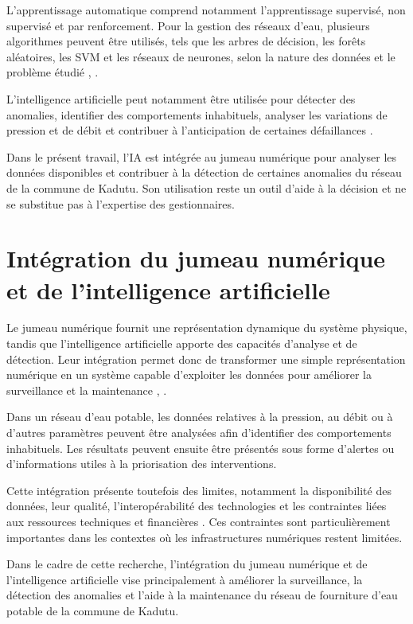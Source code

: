 L'apprentissage automatique comprend notamment l'apprentissage supervisé,
non supervisé et par renforcement. Pour la gestion des réseaux d'eau,
plusieurs algorithmes peuvent être utilisés, tels que les arbres de
décision, les forêts aléatoires, les SVM et les réseaux de neurones,
selon la nature des données et le problème étudié \cite{ref70},
\cite{ref71}.

L'intelligence artificielle peut notamment être utilisée pour détecter
des anomalies, identifier des comportements inhabituels, analyser les
variations de pression et de débit et contribuer à l'anticipation de
certaines défaillances \cite{ref73}.

Dans le présent travail, l'IA est intégrée au jumeau numérique pour
analyser les données disponibles et contribuer à la détection de
certaines anomalies du réseau de la commune de Kadutu. Son utilisation
reste un outil d'aide à la décision et ne se substitue pas à
l'expertise des gestionnaires.

\section{Intégration du jumeau numérique et de l'intelligence artificielle}
\label{integration-du-jumeau-numerique-et-de-lintelligence-artificielle}

Le jumeau numérique fournit une représentation dynamique du système
physique, tandis que l'intelligence artificielle apporte des capacités
d'analyse et de détection. Leur intégration permet donc de transformer
une simple représentation numérique en un système capable d'exploiter les
données pour améliorer la surveillance et la maintenance
\cite{ref60}, \cite{ref61}.

Dans un réseau d'eau potable, les données relatives à la pression, au
débit ou à d'autres paramètres peuvent être analysées afin d'identifier
des comportements inhabituels. Les résultats peuvent ensuite être
présentés sous forme d'alertes ou d'informations utiles à la
priorisation des interventions.

Cette intégration présente toutefois des limites, notamment la
disponibilité des données, leur qualité, l'interopérabilité des
technologies et les contraintes liées aux ressources techniques et
financières \cite{ref60}. Ces contraintes sont particulièrement
importantes dans les contextes où les infrastructures numériques restent
limitées.

Dans le cadre de cette recherche, l'intégration du jumeau numérique et de
l'intelligence artificielle vise principalement à améliorer la
surveillance, la détection des anomalies et l'aide à la maintenance du
réseau de fourniture d'eau potable de la commune de Kadutu.

